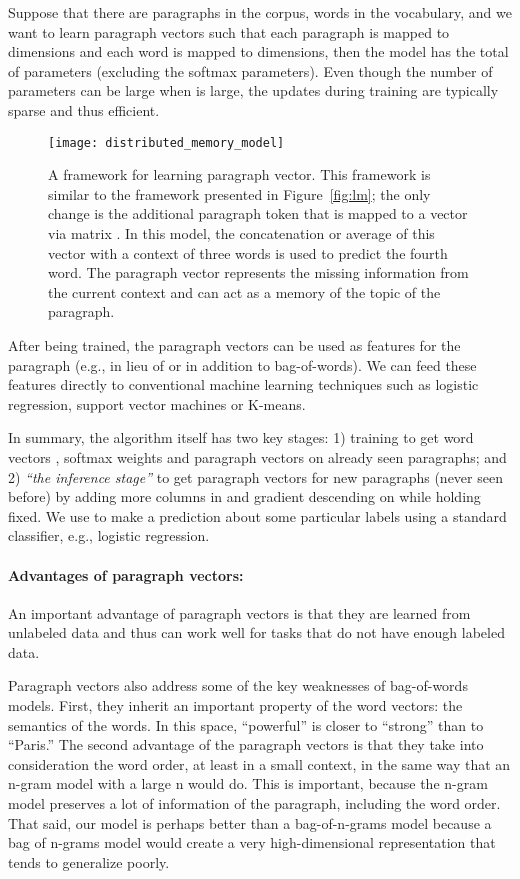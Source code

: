 \documentclass{article}
\begin{document}
Suppose that there are  paragraphs in the corpus,  words in the
vocabulary, and we want to learn paragraph vectors such that each
paragraph is mapped to  dimensions and each word is mapped to 
dimensions, then the model has the total of 
parameters (excluding the softmax parameters). Even though the number
of parameters can be large when  is large, the updates during
training are typically sparse and thus efficient.


\begin{figure}[htb]
\texttt{[image: distributed\_memory\_model]}
\caption{A framework for learning paragraph vector. This framework is
  similar to the framework presented in Figure~\ref{fig:lm}; the only
  change is the additional paragraph token that is mapped to a vector
  via matrix . In this model, the concatenation or average of this
  vector with a context of three words is used to predict the fourth
  word. The paragraph vector represents the missing information from
  the current context and can act as a memory of the topic of the
  paragraph.}
\label{fig:lm2}
\end{figure}

After being trained, the paragraph vectors can be used as features for
the paragraph (e.g., in lieu of or in addition to bag-of-words). We can
feed these features directly to conventional machine learning
techniques such as logistic regression, support vector machines or
K-means.

In summary, the algorithm itself has two key stages: 1) training to
get word vectors , softmax weights  and paragraph vectors 
on already seen paragraphs; and 2) \emph{``the inference stage''} to
get paragraph vectors  for new paragraphs (never seen before) by
adding more columns in  and gradient descending on  while
holding  fixed. We use  to make a prediction about some
particular labels using a standard classifier, e.g., logistic
regression.



\paragraph{Advantages of paragraph vectors:}
An important advantage of paragraph vectors is that they are learned
from unlabeled data and thus can work well for tasks that do not have
enough labeled data.

Paragraph vectors also address some of the key weaknesses of
bag-of-words models. First, they inherit an important property of the
word vectors: the semantics of the words. In this space, ``powerful''
is closer to ``strong'' than to ``Paris.''  The second advantage of
the paragraph vectors is that they take into consideration the word
order, at least in a small context, in the same way that an n-gram
model with a large n would do. This is important, because the n-gram
model preserves a lot of information of the paragraph, including the
word order. That said, our model is perhaps better than a
bag-of-n-grams model because a bag of n-grams model would create a
very high-dimensional representation that tends to generalize poorly.
\end{document}
